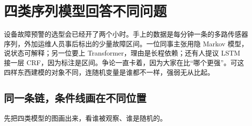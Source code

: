 \section{四类序列模型回答不同问题}
\label{sec:13-Machine-Learning/07-Graphical-and-Sequential-Models/05}

设备故障预警的选型会已经开了两个小时。手上的数据是每分钟一条的多路传感器序列，外加运维人员事后标出的少量故障区间。一位同事主张用隐 Markov 模型，说状态可解释；另一位要上 Transformer，理由是长程依赖；还有人提议 LSTM 接一层 CRF，因为标注是区间。争论一直卡着，因为大家在比``哪个更强''。可这四样东西建模的对象不同，连随机变量是谁都不一样，强弱无从比起。

\subsection{同一条链，条件线画在不同位置}

先把四类模型的图画出来，看谁被观察、谁是随机的。

